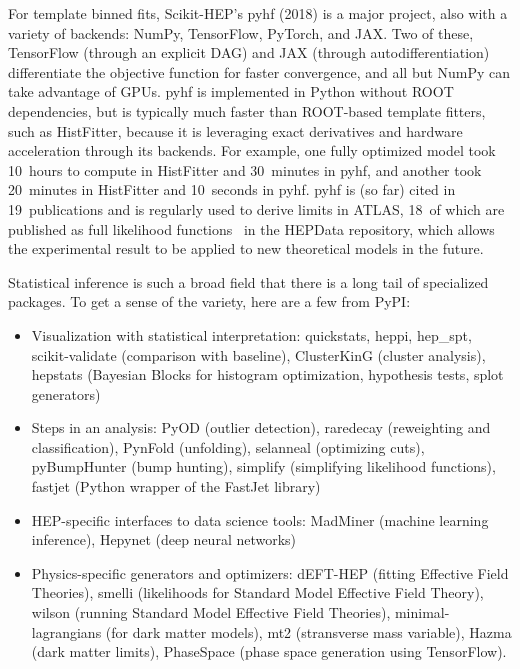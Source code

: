 \documentclass[12pt,a4paper]{article}
\begin{document}
For template binned fits, Scikit-HEP's pyhf (2018) is a major project, also with a variety of backends: NumPy, TensorFlow, PyTorch, and JAX. Two of these, TensorFlow (through an explicit DAG) and JAX (through autodifferentiation) differentiate the objective function for faster convergence, and all but NumPy can take advantage of GPUs. pyhf is implemented in Python without ROOT dependencies, but is typically much faster than ROOT-based template fitters, such as HistFitter, because it is leveraging exact derivatives and hardware acceleration through its backends. For example, one fully optimized model took 10~hours to compute in HistFitter and 30~minutes in pyhf, and another took 20~minutes in HistFitter and 10~seconds in pyhf. pyhf is (so far) cited in 19~publications and is regularly used to derive limits in ATLAS, 18~of which are published as full likelihood functions~\cite{ATL-PHYS-PUB-2019-029} in the HEPData repository, which allows the experimental result to be applied to new theoretical models in the future.

Statistical inference is such a broad field that there is a long tail of specialized packages. To get a sense of the variety, here are a few from PyPI:

\begin{itemize}
\item Visualization with statistical interpretation: quickstats, heppi, hep\_spt, scikit-validate (comparison with baseline), ClusterKinG (cluster analysis), hepstats (Bayesian Blocks for histogram optimization, hypothesis tests, splot generators)
\item Steps in an analysis: PyOD (outlier detection), raredecay (reweighting and classification), PynFold (unfolding), selanneal (optimizing cuts), pyBumpHunter (bump hunting), simplify (simplifying likelihood functions), fastjet (Python wrapper of the FastJet library)
\item HEP-specific interfaces to data science tools: MadMiner (machine learning inference), Hepynet (deep neural networks)
\item Physics-specific generators and optimizers: dEFT-HEP (fitting Effective Field Theories), smelli (likelihoods for Standard Model Effective Field Theory), wilson (running Standard Model Effective Field Theories), minimal-lagrangians (for dark matter models), mt2 (stransverse mass variable), Hazma (dark matter limits), PhaseSpace (phase space generation using TensorFlow).
\end{itemize}
\end{document}
